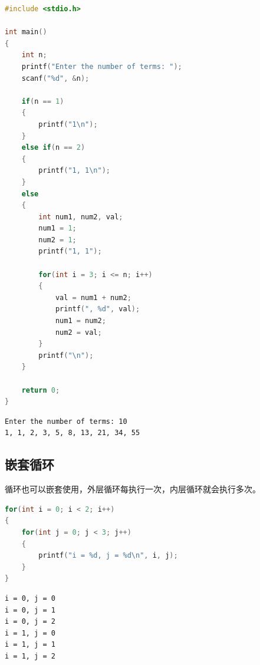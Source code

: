 \begin{lstlisting}[language=C]
#include <stdio.h>

int main()
{
    int n;
    printf("Enter the number of terms: ");
    scanf("%d", &n);

    if(n == 1)
    {
        printf("1\n");
    }
    else if(n == 2)
    {
        printf("1, 1\n");
    }
    else
    {
        int num1, num2, val;
        num1 = 1;
        num2 = 1;
        printf("1, 1");

        for(int i = 3; i <= n; i++)
        {
            val = num1 + num2;
            printf(", %d", val);
            num1 = num2;
            num2 = val;
        }
        printf("\n");
    }
    
    return 0;
}
\end{lstlisting}

\begin{tcolorbox}
    \begin{verbatim}
Enter the number of terms: 10
1, 1, 2, 3, 5, 8, 13, 21, 34, 55
\end{verbatim}
\end{tcolorbox}

\vspace{0.5cm}

\subsection{嵌套循环}

循环也可以嵌套使用，外层循环每执行一次，内层循环就会执行多次。

\begin{lstlisting}[language=C]
for(int i = 0; i < 2; i++)
{
    for(int j = 0; j < 3; j++)
    {
        printf("i = %d, j = %d\n", i, j);
    }
}
\end{lstlisting}

\begin{tcolorbox}
    \begin{verbatim}
i = 0, j = 0
i = 0, j = 1
i = 0, j = 2
i = 1, j = 0
i = 1, j = 1
i = 1, j = 2
\end{verbatim}
\end{tcolorbox}

\vspace{0.5cm}

\\

